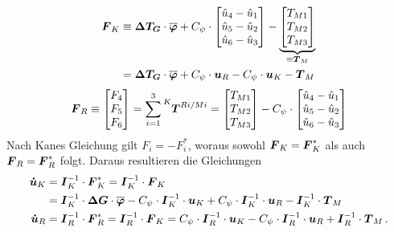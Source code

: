\begin{equation}
\begin{split}
\boldsymbol{F}_K &\equiv \boldsymbol{\Delta T_G}\cdot \overline{\boldsymbol{\varphi}} + C_{\psi}\cdot \begin{bmatrix}
\hat{u}_4 - \hat{u}_1 \\ \hat{u}_5 - \hat{u}_2 \\ \hat{u}_6 - \hat{u}_3
\end{bmatrix} - \underbrace{\begin{bmatrix}
T_{M1} \\ T_{M2} \\ T_{M3}
\end{bmatrix}}_{\equiv \boldsymbol{T}_M}
\\
&= \boldsymbol{\Delta T_G} \cdot \overline{\boldsymbol{\varphi}} + C_{\psi} \cdot \boldsymbol{u}_R - C_{\psi} \cdot \boldsymbol{u}_K  - \boldsymbol{T}_M
\end{split}
\end{equation}
\begin{equation}
\bs{F}_R \equiv \begin{bmatrix} F_4 \\ F_5 \\ F_6 \end{bmatrix} = \sum^3_{i=1} \presuper{K}{\bs{T}^{Ri/Mi}} = \begin{bmatrix}
T_{M1} \\ T_{M2} \\ T_{M3}
\end{bmatrix} - C_{\psi}\cdot \begin{bmatrix}
\hat{u}_4 - \hat{u}_1 \\ \hat{u}_5 - \hat{u}_2 \\ \hat{u}_6 - \hat{u}_3
\end{bmatrix}
\end{equation}
Nach Kanes Gleichung gilt $F_i=-F^*_i$, woraus sowohl $\boldsymbol{F}_K=\boldsymbol{F}^*_K$ als auch $\boldsymbol{F}_R=\boldsymbol{F}^*_R$ folgt. Daraus resultieren die Gleichungen
\begin{align}
\label{eq_ZRD3D_zeile2}
\boldsymbol{\dot{u}}_K &= \boldsymbol{I}^{-1}_K \cdot \boldsymbol{F}^*_K = \boldsymbol{I}^{-1}_K \cdot \boldsymbol{F}_K 
\\
&= \boldsymbol{I}^{-1}_K \cdot \boldsymbol{\Delta G} \cdot \boldsymbol{\overline{\varphi}} - C_{\psi}\cdot \boldsymbol{I}^{-1}_K \cdot \boldsymbol{u}_K + C_{\psi}\cdot \boldsymbol{I}^{-1}_K \cdot \boldsymbol{u}_R - \boldsymbol{I}^{-1}_K \cdot \boldsymbol{T}_M \nonumber
\\
\label{eq_ZRD3D_zeile3}
\boldsymbol{\dot{u}}_R &= \boldsymbol{I}^{-1}_R \cdot \boldsymbol{F}^*_R = \boldsymbol{I}^{-1}_R \cdot \boldsymbol{F}_K =
 C_{\psi}\cdot \boldsymbol{I}^{-1}_R \cdot \boldsymbol{u}_K - C_{\psi}\cdot \boldsymbol{I}^{-1}_R \cdot \boldsymbol{u}_R + \boldsymbol{I}^{-1}_R \cdot \boldsymbol{T}_M \,.
\end{align}
